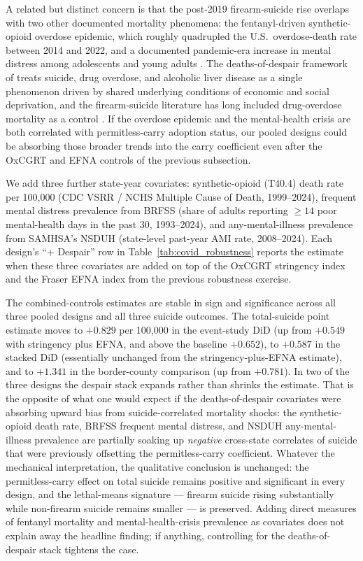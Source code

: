 \documentclass[12pt]{article}
\begin{document}
A related but distinct concern is that the post-2019 firearm-suicide
rise overlaps with two other documented mortality phenomena: the
fentanyl-driven synthetic-opioid overdose epidemic, which roughly
quadrupled the U.S.\ overdose-death rate between 2014 and 2022, and
a documented pandemic-era increase in mental distress among
adolescents and young adults \citep{czeisler2020, twengejoiner2020,
yard2021}. The deaths-of-despair framework of \citet{casedeaton2015,
casedeaton2017} treats suicide, drug overdose, and alcoholic liver
disease as a single phenomenon driven by shared underlying
conditions of economic and social deprivation, and the firearm-suicide
literature has long included drug-overdose mortality as a control
\citep{crifasi2015, ruhm2018, hollingsworth2017}. If the overdose
epidemic and the mental-health crisis are both correlated with
permitless-carry adoption status, our pooled designs could be
absorbing those broader trends into the carry coefficient even after
the OxCGRT and EFNA controls of the previous subsection.

We add three further state-year covariates: synthetic-opioid (T40.4)
death rate per 100,000 (CDC VSRR / NCHS Multiple Cause of Death,
1999--2024), frequent mental distress prevalence from BRFSS (share
of adults reporting $\geq 14$ poor mental-health days in the past
30, 1993--2024), and any-mental-illness prevalence from SAMHSA's
NSDUH (state-level past-year AMI rate, 2008--2024). Each design's
``+ Despair'' row in Table~\ref{tab:covid_robustness} reports the
estimate when these three covariates are added on top of the OxCGRT
stringency index and the Fraser EFNA index from the previous
robustness exercise.

The combined-controls estimates are stable in sign and significance
across all three pooled designs and all three suicide outcomes. The
total-suicide point estimate moves to $+0.829$ per 100,000 in the
event-study DiD (up from $+0.549$ with stringency plus EFNA, and
above the baseline $+0.652$), to $+0.587$ in the stacked DiD
(essentially unchanged from the stringency-plus-EFNA estimate),
and to $+1.341$ in the border-county comparison (up from $+0.781$).
In two of the three designs the despair stack expands rather than
shrinks the estimate. That is the opposite of what one would expect
if the deaths-of-despair covariates were absorbing upward bias from
suicide-correlated mortality shocks: the synthetic-opioid death
rate, BRFSS frequent mental distress, and NSDUH any-mental-illness
prevalence are partially soaking up \emph{negative} cross-state
correlates of suicide that were previously offsetting the
permitless-carry coefficient. Whatever the mechanical
interpretation, the qualitative conclusion is unchanged: the
permitless-carry effect on total suicide remains positive and
significant in every design, and the lethal-means signature ---
firearm suicide rising substantially while non-firearm suicide
remains smaller --- is preserved. Adding direct measures of fentanyl
mortality and mental-health-crisis prevalence as covariates does not
explain away the headline finding; if anything, controlling for the
deaths-of-despair stack tightens the case.
\end{document}
